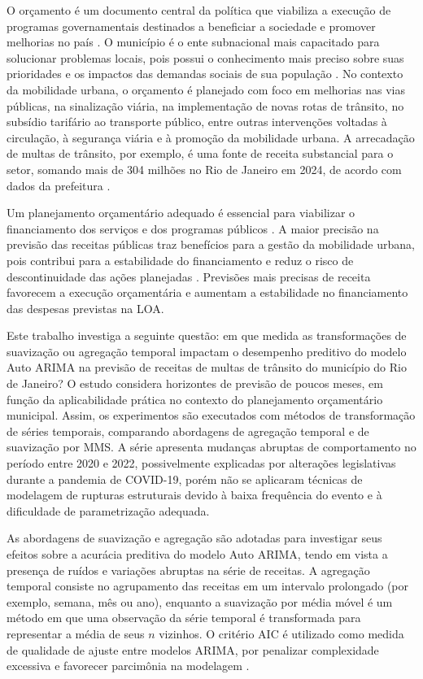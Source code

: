 \documentclass[12pt]{tcc}
\begin{document}
O orçamento é um documento central da política que viabiliza a execução de programas governamentais destinados a beneficiar a sociedade e promover melhorias no país \citep{speeden_fatores_2019}. O município é o ente subnacional mais capacitado para solucionar problemas locais, pois possui o conhecimento mais preciso sobre suas prioridades e os impactos das demandas sociais de sua população \citep{louzano_causalidade_2019}. No contexto da mobilidade urbana, o orçamento é planejado com foco em melhorias nas vias públicas, na sinalização viária, na implementação de novas rotas de trânsito, no subsídio tarifário ao transporte público, entre outras intervenções voltadas à circulação, à segurança viária e à promoção da mobilidade urbana. A arrecadação de multas de trânsito, por exemplo, é uma fonte de receita substancial para o setor, somando mais de 304 milhões no Rio de Janeiro em 2024, de acordo com dados da prefeitura \citep{limaNetoRJMultasArrecadacaoGlobo}.

Um planejamento orçamentário adequado é essencial para viabilizar o financiamento dos serviços e dos programas públicos \citep{nascimento_fatores_2022}. A maior precisão na previsão das receitas públicas traz benefícios para a gestão da mobilidade urbana, pois contribui para a estabilidade do financiamento e reduz o risco de descontinuidade das ações planejadas \citep{da2017orccamento}. Previsões mais precisas de receita favorecem a execução orçamentária e aumentam a estabilidade no financiamento das despesas previstas na \gls{LOA}.

Este trabalho investiga a seguinte questão: em que medida as transformações de suavização ou agregação temporal impactam o desempenho preditivo do modelo Auto \gls{ARIMA} na previsão de receitas de multas de trânsito do município do Rio de Janeiro? O estudo considera horizontes de previsão de poucos meses, em função da aplicabilidade prática no contexto do planejamento orçamentário municipal. Assim, os experimentos são executados com métodos de transformação de séries temporais, comparando abordagens de agregação temporal e de suavização por \gls{MMS}. A série apresenta mudanças abruptas de comportamento no período entre 2020 e 2022, possivelmente explicadas por alterações legislativas durante a pandemia de COVID-19, porém não se aplicaram técnicas de modelagem de rupturas estruturais devido à baixa frequência do evento e à dificuldade de parametrização adequada.

As abordagens de suavização e agregação são adotadas para investigar seus efeitos sobre a acurácia preditiva do modelo Auto ARIMA, tendo em vista a presença de ruídos e variações abruptas na série de receitas. A agregação temporal consiste no agrupamento das receitas em um intervalo prolongado (por exemplo, semana, mês ou ano), enquanto a suavização por média móvel é um método em que uma observação da série temporal é transformada para representar a média de seus $n$ vizinhos. O critério AIC é utilizado como medida de qualidade de ajuste entre modelos \gls{ARIMA}, por penalizar complexidade excessiva e favorecer parcimônia na modelagem \citep{hyndman_automatic_2008}.
\end{document}
